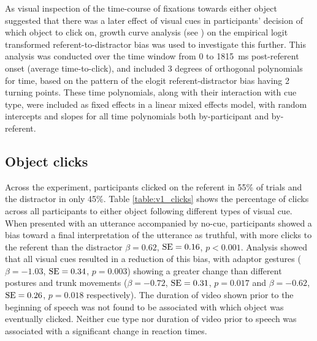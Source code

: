 \documentclass[a4paper,man,natbib]{apa6}
\newcommand{\resultsLog}[3]{$\beta = #1$, $\textnormal{SE} = #2$, $p #3$}
\begin{document}
As visual inspection of the time-course of fixations towards either object suggested that there was a later effect of visual cues in participants' decision of which object to click on, growth curve analysis (see \citealt{Mirman2008}) on the empirical logit transformed referent-to-distractor bias was used to investigate this further. 
This analysis was conducted over the time window from 0 to 1815~ms post-referent onset (average time-to-click), and included 3 degrees of orthogonal polynomials for time, based on the pattern of the elogit referent-distractor bias having 2 turning points. 
These time polynomials, along with their interaction with cue type, were included as fixed effects in a linear mixed effects model, with random intercepts and slopes for all time polynomials both by-participant and by-referent.


\subsection{Object clicks} 
Across the experiment, participants clicked on the referent in 55\% of trials and the distractor in only 45\%.
Table \ref{table:v1_clicks} shows the percentage of clicks across all participants to either object following different types of visual cue.
When presented with an utterance accompanied by no-cue, participants showed a bias toward a final interpretation of the utterance as truthful, with more clicks to the referent than the distractor \resultsLog{0.62}{0.16}{<0.001}.
Analysis showed that all visual cues resulted in a reduction of this bias, with adaptor gestures (\resultsLog{-1.03}{0.34}{=0.003}) showing a greater change than different postures and trunk movements (\resultsLog{-0.72}{0.31}{=0.017} and \resultsLog{-0.62}{0.26}{=0.018} respectively). 
The duration of video shown prior to the beginning of speech was not found to be associated with which object was eventually clicked.
Neither cue type nor duration of video prior to speech was associated with a significant change in reaction times.
\end{document}
